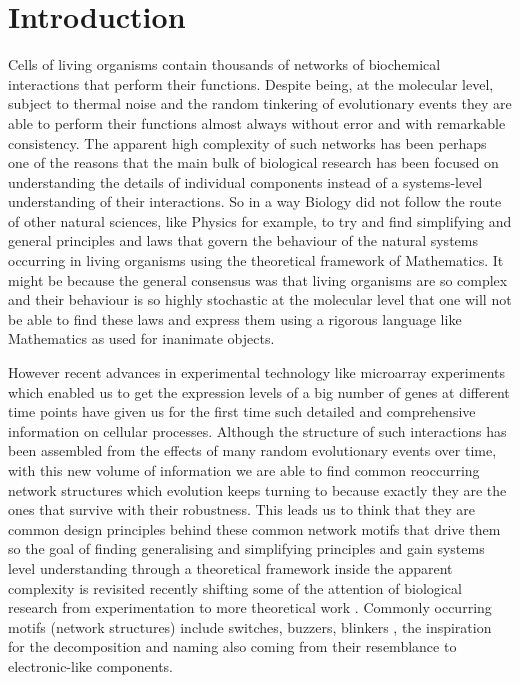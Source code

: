 \chapter{Introduction}
\ifpdf
    \graphicspath{{Introduction/IntroductionFigs/PNG/}{Introduction/IntroductionFigs/PDF/}{Introduction/IntroductionFigs/}}
\else
    \graphicspath{{Introduction/IntroductionFigs/EPS/}{Introduction/IntroductionFigs/}}
\fi


Cells of living organisms contain thousands of networks of biochemical interactions that perform their functions. Despite being, at the molecular level, subject to thermal noise and the random tinkering of evolutionary events they are able to perform their functions almost always without error and with remarkable consistency. The apparent high complexity of such networks has been perhaps one of the reasons that the main bulk of biological research has been focused on understanding the details of individual components instead of a systems-level understanding of their interactions. So in a way Biology did not follow the route of other natural sciences, like Physics for example, to try and find simplifying and general principles and laws that govern the behaviour of the natural systems occurring in living organisms using the theoretical framework of Mathematics. It might be because the general consensus was that living organisms are so complex and their behaviour is so highly stochastic at the molecular level that one will not be able to find these laws and express them using a rigorous language like Mathematics as used for inanimate objects. 

However recent advances in experimental technology like microarray experiments which enabled us to get the expression levels of a big number of genes at different time points have given us for the first time such detailed and comprehensive information on cellular processes.  Although the structure of such interactions has been assembled from the effects of many random evolutionary events over time, with this new volume of information we  are able to find common reoccurring network structures which evolution keeps turning to because exactly they are the ones that survive with their robustness. This leads us to think that they are common design principles behind these common network motifs that drive them so the goal of finding generalising and simplifying principles and gain systems level understanding through a theoretical framework inside the apparent complexity is revisited recently shifting some of the attention of biological research from experimentation to more theoretical work \cite[] {alon2007introduction}. Commonly occurring motifs (network structures) include switches, buzzers, blinkers \cite[] {tyson2003sniffers}, the inspiration for the decomposition and naming also coming from their resemblance to electronic-like components.

